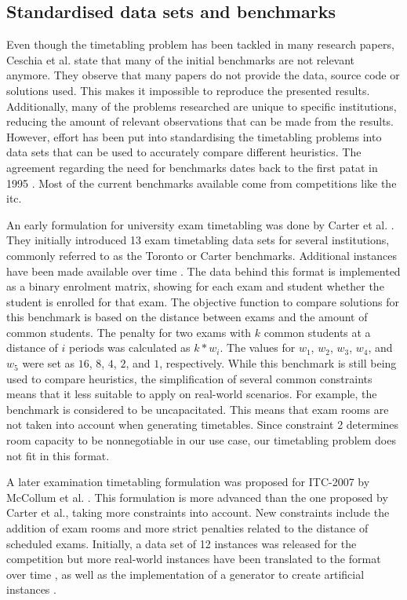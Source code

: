 \subsection{Standardised data sets and benchmarks} \label{benchmarks}

Even though the timetabling problem has been tackled in many research papers, Ceschia et al.\cite{ceschia2022} state that many of the initial benchmarks are not relevant anymore. They observe that many papers do not provide the data, source code or solutions used. This makes it impossible to reproduce the presented results. Additionally, many of the problems researched are unique to specific institutions, reducing the amount of relevant observations that can be made from the results. However, effort has been put into standardising the timetabling problems into data sets that can be used to accurately compare different heuristics. The agreement regarding the need for benchmarks dates back to the first \acrfull{patat} in 1995 \cite{cumming1995}. Most of the current benchmarks available come from competitions like the \acrfull{itc}.

An early formulation for university exam timetabling was done by Carter et al. \cite{carter1996}. They initially introduced 13 exam timetabling data sets for several institutions, commonly referred to as the Toronto or Carter benchmarks. Additional instances have been made available over time \cite{bellio2021}. The data behind this format is implemented as a binary enrolment matrix, showing for each exam and student whether the student is enrolled for that exam. The objective function to compare solutions for this benchmark is based on the distance between exams and the amount of common students. The penalty for two exams with $k$ common students at a distance of $i$ periods was calculated as $k*w_{i}$. The values for $w_1$, $w_2$, $w_3$, $w_4$, and $w_5$ were set as $16$, $8$, $4$, $2$, and $1$, respectively. While this benchmark is still being used to compare heuristics, the simplification of several common constraints means that it less suitable to apply on real-world scenarios. For example, the benchmark is considered to be uncapacitated. This means that exam rooms are not taken into account when generating timetables. Since constraint 2 determines room capacity to be nonnegotiable in our use case, our timetabling problem does not fit in this format.

A later examination timetabling formulation was proposed for ITC-2007 by McCollum et al. \cite{mccollum2007}. This formulation is more advanced than the one proposed by Carter et al., taking more constraints into account. New constraints include the addition of exam rooms and more strict penalties related to the distance of scheduled exams. Initially, a data set of 12 instances was released for the competition but more real-world instances have been translated to the format over time \cite{parkes2010}, as well as the implementation of a generator to create artificial instances \cite{battistutta2017}.

